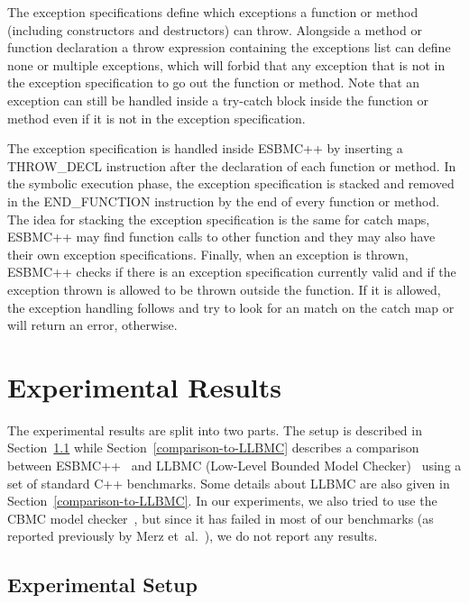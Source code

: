 \documentclass[a4paper]{llncs}
\begin{document}
The exception specifications define which exceptions a
function or method (including constructors
and destructors) can throw. Alongside a method or
function declaration a throw expression containing
the exceptions list can define none or
multiple exceptions, which will forbid that
any exception that is not in the exception
specification to go out the function or method. Note
that an exception can still be handled inside
a try-catch block inside the function or method
even if it is not in the exception specification.

The exception specification is handled inside ESBMC++
by inserting a THROW\_DECL instruction after the declaration
of each function or method. In the symbolic execution phase,
the exception specification is stacked and removed in the
END\_FUNCTION instruction by the end of every
function or method. The idea for stacking the exception
specification is the same for catch maps, ESBMC++ may
find function calls to other
function and they may also have their own exception specifications.
Finally, when an exception is thrown, ESBMC++ checks if there is an
exception specification currently valid and if the exception thrown
is allowed to be thrown outside the function. If it is allowed, the
exception handling follows and try to look for an match on the catch
map or will return an error, otherwise.


\section{Experimental Results}

The experimental results are split into two parts.
The setup is described in Section~\ref{experimental-setup}
while Section~\ref{comparison-to-LLBMC} describes a comparison
between ESBMC++~\cite{esbmc12} and
LLBMC (Low-Level Bounded Model Checker)~\cite{llbmc12}
using a set of standard C++ benchmarks. Some details about LLBMC
are also given in Section~\ref{comparison-to-LLBMC}.
In our experiments, we also tried to use the CBMC model checker~\cite{Clarke04},
but since it has failed in most of our benchmarks (as reported previously
by Merz et~al.~\cite{Florian12}), we do not report any results.

\subsection{Experimental Setup}
\label{experimental-setup}
\end{document}
